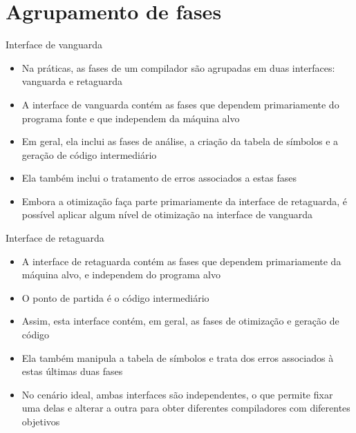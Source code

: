 \section{Agrupamento de fases}

\begin{frame}[fragile]{Interface de vanguarda}

    \begin{itemize}
        \item Na práticas, as fases de um compilador são agrupadas em duas interfaces: vanguarda e retaguarda

        \item A interface de vanguarda contém as fases que dependem primariamente do programa fonte e que independem da máquina alvo

        \item Em geral, ela inclui as fases de análise, a criação da tabela de símbolos e a geração de código intermediário

        \item Ela também inclui o tratamento de erros associados a estas fases

        \item Embora a otimização faça parte primariamente da interface de retaguarda, é possível aplicar algum nível de otimização na interface de
        vanguarda
    \end{itemize}

\end{frame}

\begin{frame}[fragile]{Interface de retaguarda}

    \begin{itemize}
        \item A interface de retaguarda contém as fases que dependem primariamente da máquina alvo, e independem do programa alvo

        \item O ponto de partida é o código intermediário

        \item Assim, esta interface contém, em geral, as fases de otimização e geração de código

        \item Ela também manipula a tabela de símbolos e trata dos erros associados à estas últimas duas fases

        \item No cenário ideal, ambas interfaces são independentes, o que permite fixar uma delas e alterar a outra para obter diferentes compiladores com
        diferentes objetivos
    \end{itemize}

\end{frame}

